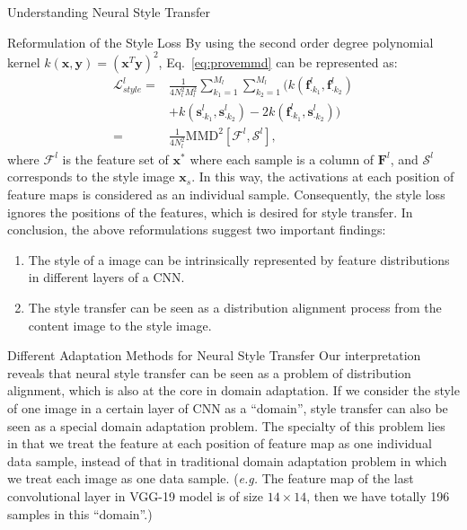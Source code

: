 \documentclass{article}
\newcommand{\col}[2]{#1_{\cdot #2}}
\begin{document}
\begin{section}{Understanding Neural Style Transfer}
\begin{subsection}{Reformulation of the Style Loss}
By using the second order degree polynomial kernel $k(\mathbf{x}, \mathbf{y}) = (\mathbf{x}^T\mathbf{y})^2$, Eq.~\ref{eq:provemmd} can be represented as:
\begin{equation}\label{eq:prove_result}
\begin{aligned}
\mathcal{L}_{style}^l =& \frac{1}{4N_l^2M_l^2}\sum_{k_1=1}^{M_l}\sum_{k_2=1}^{M_l}  
	\Big( k(\col{\mathbf{f}^l}{k_1}, \col{\mathbf{f}^l}{k_2}) \\
		 & + k(\col{\mathbf{s}^l}{k_1}, \col{\mathbf{s}^l}{k_2}) 
		 - 2k(\col{\mathbf{f}^l}{k_1}, \col{\mathbf{s}^l}{k_2})
	\Big)\\
	=& \frac{1}{4N_l^2} \text{MMD}^2[\mathcal{F}^{l}, \mathcal{S}^{l}],
\end{aligned}
\end{equation}
where $\mathcal{F}^{l}$ is the feature set of $\mathbf{x}^*$ where each sample is a column of $\mathbf{F}^l$, and $\mathcal{S}^{l}$ corresponds to the style image $\mathbf{x}_s$. In this way, the activations at each position of feature maps is considered as an individual sample. Consequently, the style loss ignores the positions of the features, which is desired for style transfer. In conclusion, the above reformulations suggest two important findings:
\begin{enumerate}
\item The style of a image can be intrinsically represented by feature distributions in different layers of a CNN.
\item The style transfer can be seen as a distribution alignment process from the content image to the style image. 
\end{enumerate}
\end{subsection}

\begin{subsection}{Different Adaptation Methods for Neural Style Transfer}\label{sec:methods}
Our interpretation reveals that neural style transfer can be seen as a problem of distribution alignment, which is also at the core in domain adaptation. If we consider the style of one image in a certain layer of CNN as a ``domain'', style transfer can also be seen as a special domain adaptation problem. The specialty of this problem lies in that we treat the feature at each position of feature map as one individual data sample, instead of that in traditional domain adaptation problem in which we treat each image as one data sample. (\emph{e.g.} The feature map of the last convolutional layer in VGG-19 model is of size $14 \times 14$, then we have totally 196 samples in this ``domain''.)



\end{subsection}
\end{section}
\end{document}
